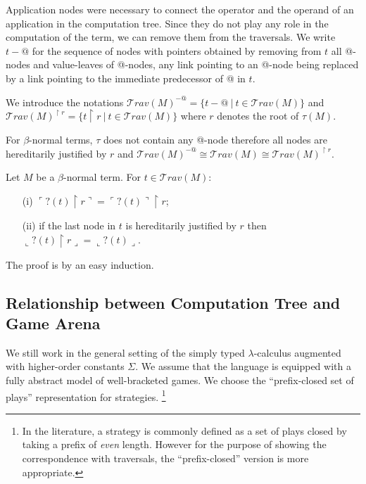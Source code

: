 \documentclass{llncs}
\newcommand\travset{\mathcal{T}rav}
\newcommand{\oview}[1]{\llcorner #1 \lrcorner}
\newcommand{\pview}[1]{\ulcorner #1 \urcorner}
\begin{document}
Application nodes were necessary to connect the operator and
the operand of an application in the computation tree. Since they do not play
any role in the computation of the term, we can remove them from the traversals.
We write $t-@$ for the sequence of nodes with pointers obtained by
removing from $t$ all @-nodes and value-leaves of @-nodes,
any link pointing to an @-node being replaced by a link pointing to the immediate predecessor of @ in $t$.

We introduce the notations $\travset(M)^{-@} = \{ t - @ \ | \  t \in \travset(M) \}$ and $\travset(M)^{\upharpoonright r} = \{ t  \upharpoonright r \ | \  t  \in \travset(M) \}$ where $r$ denotes the root of $\tau(M)$.
\begin{remark}
For $\beta$-normal terms, $\tau$ does not contain any @-node therefore all nodes are
hereditarily justified by $r$ and $\travset(M)^{-@} \cong \travset(M) \cong  \travset(M)^{\upharpoonright r }$.
\end{remark}





\begin{lemma}
\label{lem:redtrav_trav} Let $M$ be a $\beta$-normal term. For $t\in \travset(M)$:
\begin{itemize}
\item[(i)] $ \pview{?(t) \upharpoonright  r } = \pview{?(t)} \upharpoonright r$;
\item[(ii)] if the last node in $t$ is hereditarily justified by $r$ then $ \oview{?(t) \upharpoonright r } = \oview{?(t)}$.
\end{itemize}
\end{lemma}
The proof is by an easy induction.


\subsection{Relationship between Computation Tree and Game Arena}
We still work in the general setting of the simply typed $\lambda$-calculus augmented with higher-order constants $\Sigma$.
We assume that the language is equipped with a fully abstract model of well-bracketed games.
We choose the ``prefix-closed set of plays'' representation for strategies.
\footnote{In the literature, a strategy is commonly defined as a set of plays
closed by taking a prefix of \emph{even} length. However for the purpose of showing the correspondence with traversals, the ``prefix-closed'' version is more appropriate.}
\end{document}
